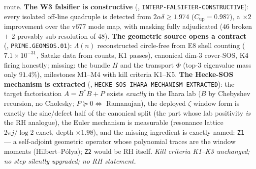 \documentclass[11pt,a4paper]{article}
\begin{document}
route.  \textbf{The W3 falsifier is constructive}
(,
\texttt{INTERP-FALSIFIER-CONSTRUCTIVE}): every isolated off-line
quadruple is detected from $2\alpha\delta\ge1.974$
($C_{\mathrm{up}}=0.987$), a $\times2$ improvement over the v677 mode
map, with masking fully adjudicated ($46$ broken $+$ $2$ provably
sub-resolution of $48$).  \textbf{The geometric source opens a
contract} (,
\texttt{PRIME.GEOMSOS.01}): $\Lambda(n)$ reconstructed circle-free
from E8 shell counting ($7.1\times10^{-31}$, Satake data from counts,
K1 passes), canonical dim-3 cover-SOS, K4 firing honestly; missing:
the bundle $H$ and the transport $\Phi$ (top-3 eigenvalue mass only
$91.4\%$), milestones M1--M4 with kill criteria K1--K5.  \textbf{The
Hecke-SOS mechanism is extracted} (,
\texttt{HECKE-SOS-IHARA-MECHANISM-EXTRACTED}): the target
factorisation $A=B^*B+P$ exists \emph{exactly} in the Ihara lab ($B$
by Chebyshev recursion, no Cholesky; $P\succeq0\iff$ Ramanujan), the
deployed $\zeta$ window form is exactly the sine/defect half of the
canonical split (the part whose lab positivity \emph{is} the RH
analogue), the Euler mechanism is measurable (resonance lattice
$2\pi j/\log2$ exact, depth $\times1.98$), and the missing ingredient
is exactly named: \texttt{Z1} --- a self-adjoint geometric operator
whose polynomial traces are the window moments (Hilbert--P\'olya);
\texttt{Z2} would be RH itself.  \emph{Kill criteria K1--K3
unchanged; no step silently upgraded; no RH statement.}
\end{document}
